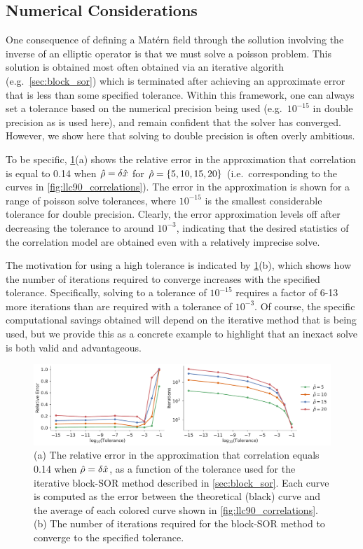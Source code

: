 \subsection{Numerical Considerations}
\label{ssec:tolerance}

One consequence of defining a Mat\'ern field through the sollution involving the
inverse of an elliptic operator is that we must solve a poisson problem.
This solution is obtained most often obtained via an iterative algorith (e.g.\
\cref{sec:block_sor}) which is
terminated after achieving an approximate error that is less than some specified
tolerance.
Within this framework, one can always set a tolerance based on the numerical precision being used
(e.g.\ $10^{-15}$ in double precision as is used here), and remain confident
that the solver has converged.
However, we show here that solving to double precision is often overly ambitious.

To be specific, \cref{fig:error_and_iters}(a) shows the relative error in the
approximation that correlation is equal to 0.14 when $\hat{\rho} = \delta\hat{x}$
for $\hat{\rho} = \{5, 10, 15, 20\}$ (i.e.\ corresponding to the curves in
\cref{fig:llc90_correlations}).
The error in the approximation is shown for a range of poisson solve tolerances,
where $10^{-15}$ is the smallest considerable tolerance for double precision.
Clearly, the error approximation levels off after decreasing the tolerance to
around $10^{-3}$, indicating that the desired statistics of the correlation
model are obtained even with a relatively imprecise solve.

The motivation for using a high tolerance is indicated by
\cref{fig:error_and_iters}(b), which shows how the number of iterations required
to converge increases with the specified tolerance.
Specifically, solving to a tolerance of $10^{-15}$ requires a factor of 6-13
more iterations than are required with a tolerance of $10^{-3}$.
Of course, the specific computational savings obtained will depend on the
iterative method that is being used, but we provide this as a concrete example
to highlight that an inexact solve is both valid and advantageous.

\begin{figure}
    \centering
    \includegraphics[width=\textwidth]{../figures/matern_llc90_error_and_iters.pdf}
    \caption{(a) The relative error in the approximation that correlation equals
        0.14 when $\hat{\rho}=\delta\hat{x}$, as a function of the tolerance used
        for the iterative block-SOR method described in \cref{sec:block_sor}.
        Each curve is computed as the error between the theoretical (black)
        curve and the average of each colored curve shown in \cref{fig:llc90_correlations}.
        (b) The number of iterations required for the block-SOR method to
        converge to the specified tolerance.
    }
    \label{fig:error_and_iters}
\end{figure}
